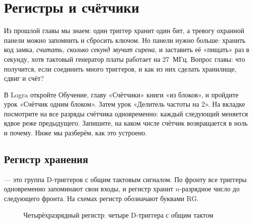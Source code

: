 \chapter{Регистры и счётчики}
\label{ch:regs}

Из прошлой главы мы знаем: один триггер хранит один бит, а тревогу
охранной панели можно запомнить и сбросить ключом. Но панели нужно больше:
хранить код замка, \emph{считать, сколько секунд звучит сирена}, и заставить
её «пищать» раз в секунду, хотя тактовый генератор платы работает на 27~МГц.
Вопрос главы: что получится, если соединить много триггеров, и как из них
сделать хранилище, сдвиг и счёт?

\begin{buildbox}
В Logra откройте Обучение, главу «Счётчики» книги «из блоков», и пройдите
урок «Счётчик одним блоком». Затем урок «Делитель частоты на 2». На вкладке
 посмотрите на все разряды счётчика одновременно: каждый
следующий меняется вдвое реже предыдущего. Запишите, на каком числе счётчик
возвращается в ноль и почему. Ниже мы разберём, как это устроено.
\end{buildbox}

\newcommand{\dff}[3]{%
  \draw[thick, fill=green!8] (#2,#3) rectangle ++(1.2,1.4);
  \node[font=\sffamily\footnotesize] at (#2+0.22,#3+1.05) {D};
  \node[font=\sffamily\footnotesize] at (#2+0.98,#3+1.05) {Q};
  \draw[thick] (#2,#3+0.2) -- (#2+0.18,#3+0.35) -- (#2,#3+0.5);
  \coordinate (#1-d) at (#2,#3+1.05); \coordinate (#1-q) at (#2+1.2,#3+1.05);
  \coordinate (#1-c) at (#2,#3+0.35);}

\section{Регистр хранения}

 --- это группа D-триггеров с общим тактовым сигналом. По
фронту все триггеры одновременно запоминают свои входы, и регистр хранит
$n$-разрядное число до следующего фронта. На схемах регистр обозначают
буквами RG.

\begin{figure}[H]
\centering
{}
\caption{Четырёхразрядный регистр: четыре D-триггера с общим тактом}
\label{fig:reg}
\end{figure}

